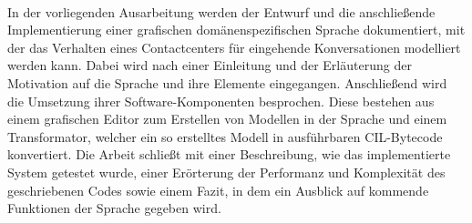 \kurzfassung

\paragraph*{}
In der vorliegenden Ausarbeitung werden der Entwurf und die anschließende Implementierung einer grafischen domänenspezifischen Sprache dokumentiert, mit der das Verhalten eines Contactcenters für eingehende Konversationen modelliert werden kann. Dabei wird nach einer Einleitung und der Erläuterung der Motivation auf die Sprache und ihre Elemente eingegangen. Anschließend wird die Umsetzung ihrer Software-Komponenten besprochen. Diese bestehen aus einem grafischen Editor zum Erstellen von Modellen in der Sprache und einem Transformator, welcher ein so erstelltes Modell in ausführbaren CIL-Bytecode konvertiert. Die Arbeit schließt mit einer Beschreibung, wie das implementierte System getestet wurde, einer Erörterung der Performanz und Komplexität des geschriebenen Codes sowie einem Fazit, in dem ein Ausblick auf kommende Funktionen der Sprache gegeben wird.